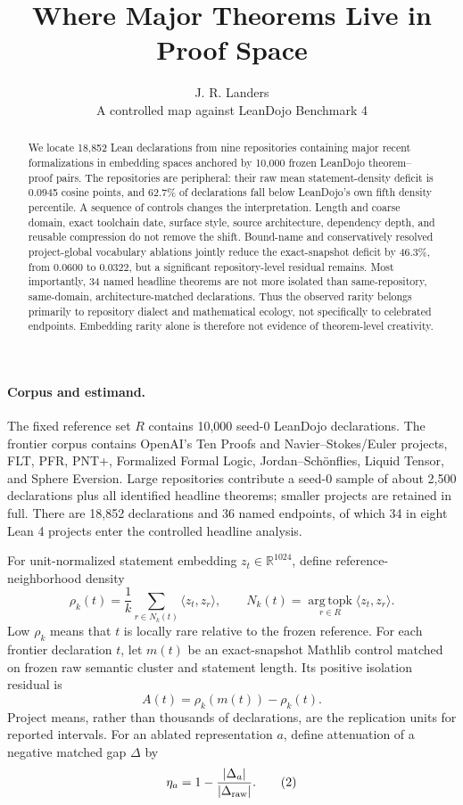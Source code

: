 \documentclass[10pt]{article}
\title{\vspace{-1.7em}\textbf{Where Major Theorems Live in Proof Space}\vspace{-0.5em}}
\author{J. R. Landers\\[-1pt]\small A controlled map against LeanDojo Benchmark 4}
\date{\vspace{-1.4em}}
\begin{document}
\maketitle
\vspace{-1.5em}

\begin{abstract}
We locate 18,852 Lean declarations from nine repositories containing major
recent formalizations in embedding spaces anchored by 10,000 frozen LeanDojo
theorem--proof pairs.  The repositories are peripheral: their raw mean
statement-density deficit is 0.0945 cosine points, and 62.7\% of declarations
fall below LeanDojo's own fifth density percentile.  A sequence of controls
changes the interpretation.  Length and coarse domain, exact toolchain date,
surface style, source architecture, dependency depth, and reusable compression
do not remove the shift.  Bound-name and conservatively resolved project-global
vocabulary ablations jointly reduce the exact-snapshot deficit by 46.3\%, from
0.0600 to 0.0322, but a significant repository-level residual remains.  Most
importantly, 34 named headline theorems are not more isolated than
same-repository, same-domain, architecture-matched declarations.  Thus the
observed rarity belongs primarily to repository dialect and mathematical
ecology, not specifically to celebrated endpoints.  Embedding rarity alone is
therefore not evidence of theorem-level creativity.
\end{abstract}

\paragraph{Corpus and estimand.}
The fixed reference set $R$ contains 10,000 seed-0 LeanDojo declarations.  The
frontier corpus contains OpenAI's Ten Proofs and Navier--Stokes/Euler projects,
FLT, PFR, PNT+, Formalized Formal Logic, Jordan--Sch\"onflies, Liquid Tensor,
and Sphere Eversion.  Large repositories contribute a seed-0 sample of about
2,500 declarations plus all identified headline theorems; smaller projects are
retained in full.  There are 18,852 declarations and 36 named endpoints, of
which 34 in eight Lean 4 projects enter the controlled headline analysis.

For unit-normalized statement embedding $z_t\in\mathbb R^{1024}$, define
reference-neighborhood density
\[
 \rho_k(t)=\frac1k\sum_{r\in N_k(t)}\langle z_t,z_r\rangle,
 \qquad
 N_k(t)=\operatorname*{arg\,topk}_{r\in R}\langle z_t,z_r\rangle .
\]
Low $\rho_k$ means that $t$ is locally rare relative to the frozen reference.
For each frontier declaration $t$, let $m(t)$ be an exact-snapshot Mathlib
control matched on frozen raw semantic cluster and statement length.  Its
positive isolation residual is
\[
 A(t)=\rho_k(m(t))-\rho_k(t).
 \tag{1}
\]
Project means, rather than thousands of declarations, are the replication
units for reported intervals.  For an ablated representation $a$, define
attenuation of a negative matched gap $\Delta$ by
\[
 \eta_a=1-\frac{|\Delta_a|}{|\Delta_{\rm raw}|}.
 \tag{2}
\]
\end{document}
